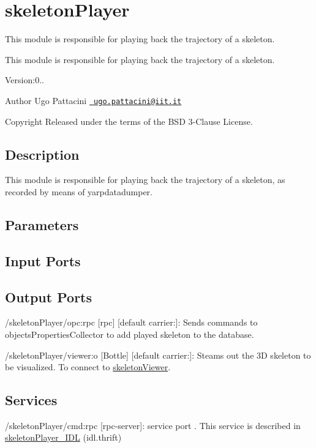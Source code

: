 \section{skeleton\+Player}
\label{group__skeletonPlayer}


This module is responsible for playing back the trajectory of a skeleton.  


This module is responsible for playing back the trajectory of a skeleton. 

Version\+:0.. \begin{DoxyAuthor}{Author}
Ugo Pattacini \href{mailto:ugo.pattacini@iit.it}{\texttt{ ugo.\+pattacini@iit.\+it}} ~\newline
 
\end{DoxyAuthor}
\begin{DoxyCopyright}{Copyright}
Released under the terms of the B\+SD 3-\/Clause License. 
\end{DoxyCopyright}
\hypertarget{group__skeletonViewer_intro_sec}{}\subsection{Description}\label{group__skeletonViewer_intro_sec}
This module is responsible for playing back the trajectory of a skeleton, as recorded by means of yarpdatadumper.\hypertarget{group__skeletonViewer_parameters_sec}{}\subsection{Parameters}\label{group__skeletonViewer_parameters_sec}
\hypertarget{group__skeletonViewer_inputports_sec}{}\subsection{Input Ports}\label{group__skeletonViewer_inputports_sec}
\hypertarget{group__skeletonViewer_outputports_sec}{}\subsection{Output Ports}\label{group__skeletonViewer_outputports_sec}

\begin{DoxyItemize}
\item /skeleton\+Player/opc\+:rpc \mbox{[}rpc\mbox{]} \mbox{[}default carrier\+:\mbox{]}\+: Sends commands to objects\+Properties\+Collector to add played skeleton to the database.
\item /skeleton\+Player/viewer\+:o \mbox{[}Bottle\mbox{]} \mbox{[}default carrier\+:\mbox{]}\+: Steams out the 3D skeleton to be visualized. To connect to \mbox{\hyperlink{group__skeletonViewer}{skeleton\+Viewer}}.
\end{DoxyItemize}\hypertarget{group__skeletonViewer_services_sec}{}\subsection{Services}\label{group__skeletonViewer_services_sec}

\begin{DoxyItemize}
\item /skeleton\+Player/cmd\+:rpc \mbox{[}rpc-\/server\mbox{]}\+: service port . This service is described in \mbox{\hyperlink{classskeletonPlayer__IDL}{skeleton\+Player\+\_\+\+I\+DL}} (idl.\+thrift) 
\end{DoxyItemize}